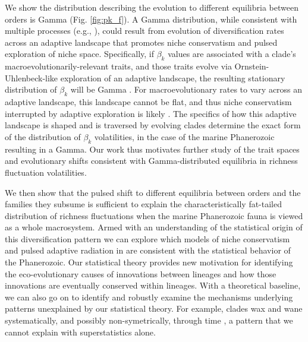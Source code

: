 \documentclass[12pt]{article}
\let\citep=\cite
\begin{document}
We show the distribution describing the evolution to different
equilibria between orders is Gamma (Fig. \ref{fig:pk_f}).  A Gamma
distribution, while consistent with multiple processes (e.g.,
\citep{cir1985}), could result from evolution of diversification rates
across an adaptive landscape that promotes niche conservatism and
pulsed exploration of niche space.  Specifically, if $\beta_k$ values
are associated with a clade's macroevolutionarily-relevant traits, and
those traits evolve via Ornstein-Uhlenbeck-like exploration of an
adaptive landscape, the resulting stationary distribution of $\beta_k$
will be Gamma \citep{cir1985, butler2004}.  For macroevolutionary
rates to vary across an adaptive landscape, this landscape cannot be
flat, and thus niche conservatism interrupted by adaptive exploration
is likely \citep{newman1985adaptive, gavrilets2004book}. The specifics
of how this adaptive landscape is shaped and is traversed by evolving
clades determine the exact form of the distribution of $\beta_k$
volatilities, in the case of the marine Phanerozoic resulting in a
Gamma. Our work thus motivates further study of the trait spaces and
evolutionary shifts consistent with Gamma-distributed equilibria in
richness fluctuation volatilities.

We then show that the pulsed shift to different equilibria between
orders and the families they subsume is sufficient to explain the
characteristically fat-tailed distribution of richness fluctuations
when the marine Phanerozoic fauna is viewed as a whole macrosystem.
Armed with an understanding of the statistical origin of this
diversification pattern we can explore which models of niche
conservatism and pulsed adaptive radiation in are consistent with the
statistical behavior of the Phanerozoic. Our statistical theory
provides new motivation for identifying the eco-evolutionary causes of
innovations between lineages and how those innovations are eventually
conserved within lineages. With a theoretical baseline, we can also go
on to identify and robustly examine the mechanisms underlying patterns
unexplained by our statistical theory. For example, clades wax and
wane systematically, and possibly non-symetrically, through time
\citep{liow2007, foote2008paleobiol, quental2013}, a pattern that we
cannot explain with superstatistics alone.
\end{document}
